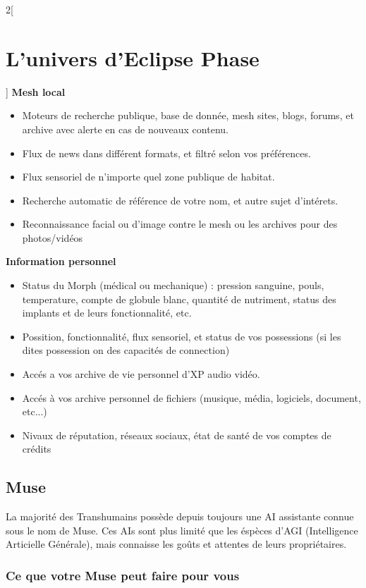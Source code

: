 \documentclass[a4paper,9pt]{article}
\begin{document}
\begin{multicols}{2}[\section{L'univers d'Eclipse Phase}]
\textbf{Mesh local}
\begin{itemize}
   \item Moteurs de recherche publique, base de donnée, mesh sites, blogs, forums, et archive
   avec alerte en cas de nouveaux contenu.
   \item Flux de news dans différent formats, et filtré selon vos préférences.
   \item Flux sensoriel de n'importe quel zone publique de habitat.
   \item Recherche automatic de référence de votre nom, et autre sujet d'intérets.
   \item Reconnaissance facial ou d'image contre le mesh ou les archives pour des photos/vidéos
\end{itemize}


\textbf{Information personnel}
\begin{itemize}
   \item Status du Morph (médical ou mechanique) : pression sanguine, pouls, temperature, compte
   de globule blanc, quantité de nutriment, status des implants et de leurs fonctionnalité, etc. 
   \item Possition, fonctionnalité, flux sensoriel, et status de vos possessions (si les dites 
   possession on des capacités de connection)
   \item Accés a vos archive de vie personnel d'XP audio vidéo.
   \item Accés à vos archive personnel de fichiers (musique, média, logiciels, document, etc...)
   \item Nivaux de réputation, réseaux sociaux, état de santé de vos comptes de crédits
\end{itemize}

\subsection{Muse}

La majorité des Transhumains possède depuis toujours une AI assistante connue sous le nom de Muse.
Ces AIs sont plus limité que les éspèces d'AGI (Intelligence Articielle Générale), mais connaisse
les goûts et attentes de leurs propriétaires.

\subsubsection{Ce que votre Muse peut faire pour vous}


\end{multicols}
\end{document}
